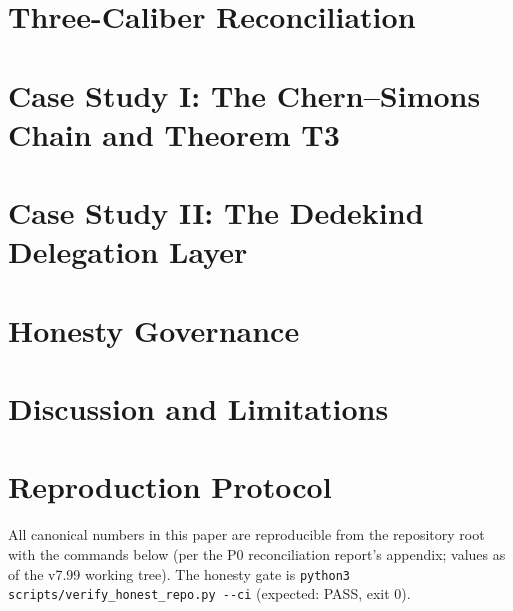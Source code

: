 \documentclass[11pt,a4paper]{article}
\begin{document}
\section{Three-Caliber Reconciliation}\label{sec:reconciliation}


\section{Case Study I: The Chern--Simons Chain and Theorem T3}\label{sec:cschain}


\section{Case Study II: The Dedekind Delegation Layer}\label{sec:dedekind}


\section{Honesty Governance}\label{sec:governance}


\section{Discussion and Limitations}\label{sec:discussion}







\appendix

\section{Reproduction Protocol}\label{sec:repro}
All canonical numbers in this paper are reproducible from the
repository root with the commands below (per the P0 reconciliation
report's appendix; values as of the v7.99 working tree). The
honesty gate is
\texttt{python3 scripts/verify\_honest\_repo.py -{}-ci} (expected:
PASS, exit 0).
\end{document}
